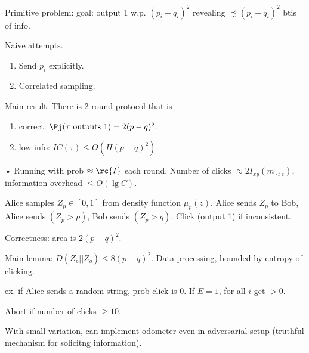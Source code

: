 Primitive problem: goal: output 1 w.p. $(p_i-q_i)^2$ revealing $\precsim (p_i-q_i)^2$ btis of info.

Naive attempts.
\begin{enumerate}
\item
Send $p_i$ explicitly.
\item
Correlated sampling.
\end{enumerate}
Main result: There is 2-round protocol that is
\begin{enumerate}
\item
correct: $\Pj(\tau\text{ outputs }1)=2(p-q)^2$.
\item
low info: $IC(\tau)\le O(H(p-q)^2)$.
\end{enumerate}•
Running with prob $\approx \rc{I}$ each round. Number of clicks $\approx 2I_{xy}(m_{<t})$, information overhead $\le O(\lg C)$.

Alice samples $Z_p\in [0,1]$ from density function $\mu_p(z)$. Alice sends $Z_p$ to Bob, Alice sends $(Z_p>p)$, Bob sends $(Z_p>q)$. Click (output 1) if inconsistent.

Correctness: area is $2(p-q)^2$. 

Main lemma: $D(Z_p||Z_q)\le 8(p-q)^2$.
Data processing, bounded by entropy of clicking. 

ex. if Alice sends a random string, prob click is 0. If $E=1$, for all $i$ get $>0$.

Abort if number of clicks $\ge 10$.

With small variation, can implement odometer even in adversarial setup (truthful mechanism for solicitng information). 

